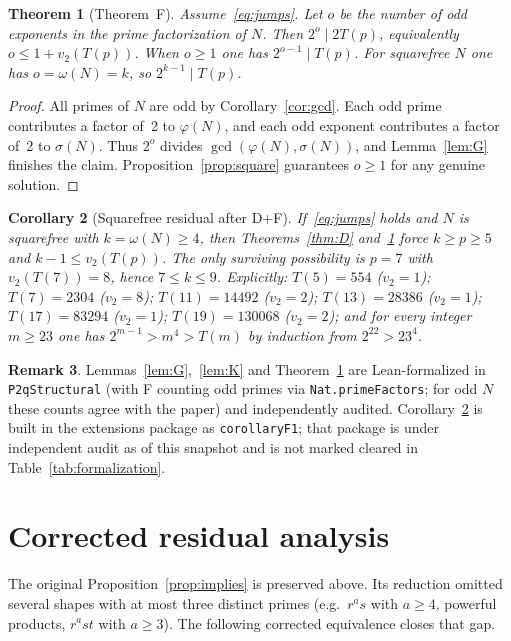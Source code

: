 \documentclass[11pt,reqno]{amsart}
\newcommand{\ph}{\varphi}
\newcommand{\sig}{\sigma}
\newtheorem{theorem}{Theorem}
\newtheorem{corollary}[theorem]{Corollary}
\theoremstyle{definition}
\newtheorem{remark}[theorem]{Remark}
\begin{document}
\begin{theorem}[Theorem~F]
\label{thm:F}
Assume~\eqref{eq:jumps}. Let \(o\) be the number of odd exponents in the prime factorization of \(N\). Then \(2^o\mid 2T(p)\), equivalently \(o\le 1+v_2(T(p))\). When \(o\ge 1\) one has \(2^{o-1}\mid T(p)\). For squarefree \(N\) one has \(o=\omega(N)=k\), so \(2^{k-1}\mid T(p)\).
\end{theorem}

\begin{proof}
All primes of \(N\) are odd by Corollary~\ref{cor:gcd}. Each odd prime contributes a factor of~2 to \(\ph(N)\), and each odd exponent contributes a factor of~2 to \(\sig(N)\). Thus \(2^o\) divides \(\gcd(\ph(N),\sig(N))\), and Lemma~\ref{lem:G} finishes the claim. Proposition~\ref{prop:square} guarantees \(o\ge 1\) for any genuine solution.
\end{proof}

\begin{corollary}[Squarefree residual after D+F]
\label{cor:F1}
If~\eqref{eq:jumps} holds and \(N\) is squarefree with \(k=\omega(N)\ge 4\), then Theorems~\ref{thm:D} and~\ref{thm:F} force \(k\ge p\ge 5\) and \(k-1\le v_2(T(p))\). The only surviving possibility is \(p=7\) with \(v_2(T(7))=8\), hence \(7\le k\le 9\). Explicitly: \(T(5)=554\) (\(v_2=1\)); \(T(7)=2304\) (\(v_2=8\)); \(T(11)=14492\) (\(v_2=2\)); \(T(13)=28386\) (\(v_2=1\)); \(T(17)=83294\) (\(v_2=1\)); \(T(19)=130068\) (\(v_2=2\)); and for every integer \(m\ge 23\) one has \(2^{m-1}>m^4>T(m)\) by induction from \(2^{22}>23^4\).
\end{corollary}

\begin{remark}
Lemmas~\ref{lem:G},~\ref{lem:K} and Theorem~\ref{thm:F} are Lean-formalized in \texttt{P2qStructural} (with F counting odd primes via \texttt{Nat.primeFactors}; for odd \(N\) these counts agree with the paper) and independently audited. Corollary~\ref{cor:F1} is built in the extensions package as \texttt{corollaryF1}; that package is under independent audit as of this snapshot and is not marked cleared in Table~\ref{tab:formalization}.
\end{remark}

\section{Corrected residual analysis}
\label{sec:residual-corrected}

The original Proposition~\ref{prop:implies} is preserved above. Its reduction omitted several shapes with at most three distinct primes (e.g.\ \(r^as\) with \(a\ge 4\), powerful products, \(r^ast\) with \(a\ge 3\)). The following corrected equivalence closes that gap.
\end{document}
